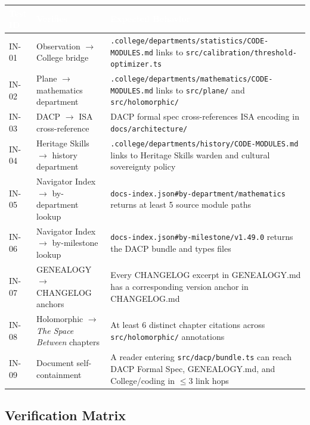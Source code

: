 \documentclass[11pt,letterpaper]{article}
\newcommand{\tableheader}[1]{\textbf{\sffamily\textcolor{white}{#1}}}
\begin{document}
\begin{center}
\begin{tabularx}{\textwidth}{C{1.5cm}L{4.5cm}X}
\toprule
{}
\tableheader{Test ID} & \tableheader{Verifies} & \tableheader{Expected Behavior} \\
\midrule
IN-01 & Observation $\to$ College bridge & \texttt{.college/departments/statistics/CODE-MODULES.md} links to \texttt{src/calibration/threshold-optimizer.ts} \\
IN-02 & Plane $\to$ mathematics department & \texttt{.college/departments/mathematics/CODE-MODULES.md} links to \texttt{src/plane/} and \texttt{src/holomorphic/} \\
IN-03 & DACP $\to$ ISA cross-reference & DACP formal spec cross-references ISA encoding in \texttt{docs/architecture/} \\
IN-04 & Heritage Skills $\to$ history department & \texttt{.college/departments/history/CODE-MODULES.md} links to Heritage Skills warden and cultural sovereignty policy \\
IN-05 & Navigator Index $\to$ by-department lookup & \texttt{docs-index.json\#by-department/mathematics} returns at least 5 source module paths \\
IN-06 & Navigator Index $\to$ by-milestone lookup & \texttt{docs-index.json\#by-milestone/v1.49.0} returns the DACP bundle and types files \\
IN-07 & GENEALOGY $\to$ CHANGELOG anchors & Every CHANGELOG excerpt in GENEALOGY.md has a corresponding version anchor in CHANGELOG.md \\
IN-08 & Holomorphic $\to$ \textit{The Space Between} chapters & At least 6 distinct chapter citations across \texttt{src/holomorphic/} annotations \\
IN-09 & Document self-containment & A reader entering \texttt{src/dacp/bundle.ts} can reach DACP Formal Spec, GENEALOGY.md, and College/coding in $\leq$3 link hops \\
\bottomrule
\end{tabularx}
\end{center}

\subsection{Verification Matrix}
\end{document}
